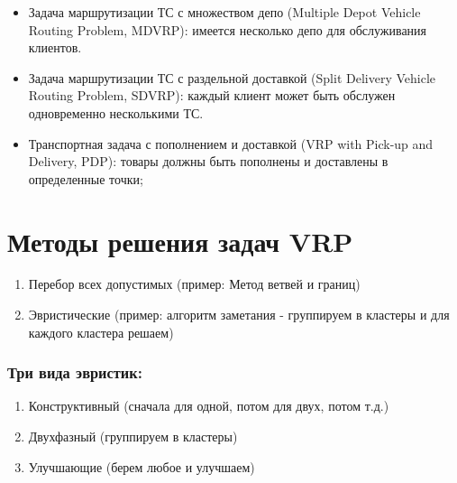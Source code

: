 {\begin{itemize}
  \item Задача маршрутизации ТС с множеством депо (Multiple Depot Vehicle Routing Problem, MDVRP): имеется несколько депо для обслуживания клиентов.

  \item Задача маршрутизации ТС с раздельной доставкой (Split Delivery Vehicle Routing Problem, SDVRP): каждый клиент может быть обслужен одновременно несколькими ТС.

  \item Транспортная задача с пополнением и доставкой (VRP with Pick-up and Delivery, PDP): товары должны быть пополнены и доставлены в определенные точки;
\end{itemize}

\section*{Методы решения задач VRP}

\begin{enumerate}
  \item Перебор всех допустимых (пример: Метод ветвей и границ)
  \item Эвристические (пример: алгоритм заметания - группируем в кластеры и для каждого кластера решаем)
\end{enumerate}

\subsubsection*{Три вида эвристик:}
\begin{enumerate}
  \item Конструктивный (сначала для одной, потом для двух, потом т.д.)
  \item Двухфазный (группируем в кластеры)
  \item Улучшающие (берем любое и улучшаем)
\end{enumerate}


    \newpage
}
